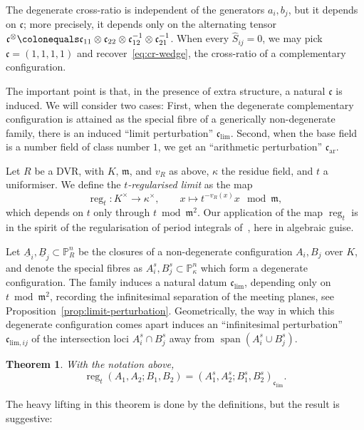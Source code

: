 \documentclass[11pt,a4paper]{amsart}
\newcommand{\pn}{\mathbb{P}^{n}}
\newcommand{\xc}{\mathfrak{c}}
\newcommand{\xm}{\mathfrak{m}}
\DeclareMathOperator{\reg}{reg}
\renewcommand{\span}{\operatorname{span}}
\theoremstyle{plain}
\newtheorem{introtheorem}{Theorem}       %
\theoremstyle{definition}
\theoremstyle{remark}
\newcommand{\coleq}{\colonequals}
\newcommand{\xci}[1][]{\xc_{\mathrm{lim}#1}} %
\newcommand{\xca}[1][]{\xc_{\mathrm{ar}#1}} %
\begin{document}
The degenerate cross-ratio is independent of the generators $a_i, b_j$, but it depends on $\xc$; more precisely, it depends only on the alternating tensor $\xc^\otimes \coleq \xc_{11} \otimes \xc_{22} \otimes \xc_{12}^{-1} \otimes \xc_{21}^{-1}$. When every $\hat S_{ij} = 0$, we may pick $\xc = (1,1,1,1)$ and recover~\eqref{eq:cr-wedge}, the cross-ratio of a complementary configuration. 



\medskip

The important point is that, in the presence of extra structure, a natural $\xc$ is induced. We will consider two cases: First, when the degenerate complementary configuration is attained as the special fibre of a generically non-degenerate family, there is an induced ``limit perturbation'' $\xci$. Second, when the base field is a number field of class number $1$, we get an ``arithmetic perturbation'' $\xca$.

Let $R$ be a DVR, with $K,\, \xm$, and $v_R$ as above, $\kappa$ the residue field, and $t$ a uniformiser. 
We define the \emph{$t$-regularised limit} as the map
\begin{equation}\label{eq:reg-limit}
  \reg_t \colon K^\times \to \kappa^\times, \qquad  x \mapsto t^{-v_R(x)} x \mod \xm,
\end{equation}
which depends on $t$ only through $t \bmod \xm^2$. Our application of the map $\reg_t$ is in the spirit of the regularisation of period integrals of~\cite{DupontPanzerPym2026}, here in algebraic guise.


Let $\underline A_i, \underline B_j \subset \pn_R$ be the closures of a non-degenerate configuration $A_i, B_j$ over $K$, and denote the special fibres as $A_i^s, B_j^s \subset \pn_\kappa$ which form a degenerate configuration. The family induces a natural datum $\xci$, depending only on $t \bmod \xm^2$, recording the infinitesimal separation of the meeting planes, see Proposition~\ref{prop:limit-perturbation}. Geometrically, the way in which this degenerate configuration comes apart induces an ``infinitesimal perturbation'' $\xci[,ij]$ of the intersection loci $A_i^s \cap B_j^s$ away from $\span(A_i^s \cup B_j^s)$.

\begin{introtheorem}\label{introthm:reg}
  With the notation above,
  \[
    \reg_t(A_1,A_2;B_1,B_2) = (A_1^s, A_2^s; B_1^s, B_2^s)_{\xci}.
  \]
\end{introtheorem}

The heavy lifting in this theorem is done by the definitions, but the result is suggestive:
\end{document}
